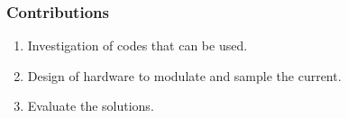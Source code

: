 \documentclass{beamer}
\begin{document}
	\begin{frame}\frametitle{Contributions}


%
%
%
%
%
%
%
%
%

		

		



		\noindent
		\begin{minipage}{.5\linewidth}
			\begin{enumerate}

				\item Investigation of codes that can be used.

				\item Design of hardware to modulate and sample the current.

				\item Evaluate the solutions.


\end{enumerate}
\end{minipage}
\end{frame}
\end{document}
